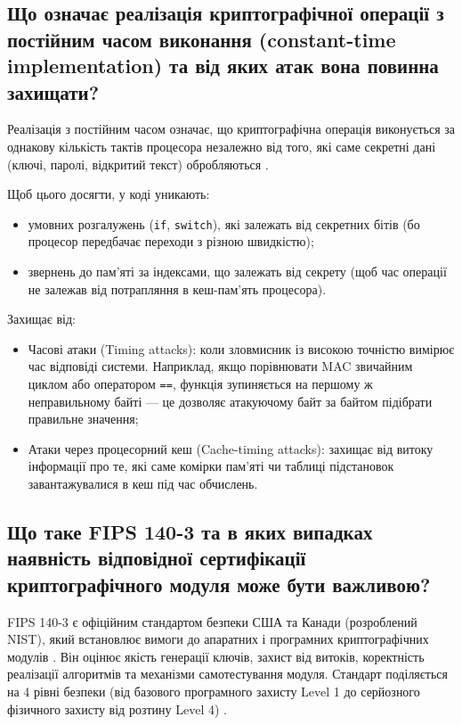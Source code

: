 \subsection{Що означає реалізація криптографічної операції з постійним часом виконання (constant-time implementation) та від яких атак вона повинна захищати?}

Реалізація з постійним часом означає, що криптографічна операція виконується за однакову кількість тактів процесора незалежно від того, які саме секретні дані (ключі, паролі, відкритий текст) обробляються \cite{Libsodium}.

Щоб цього досягти, у коді уникають:
\begin{itemize}
    \item умовних розгалужень (\texttt{if}, \texttt{switch}), які залежать від секретних бітів (бо процесор передбачає переходи з різною швидкістю);
    \item звернень до пам'яті за індексами, що залежать від секрету (щоб час операції не залежав від потрапляння в кеш-пам'ять процесора).
\end{itemize}

Захищає від:
\begin{itemize}
    \item Часові атаки (Timing attacks): коли зловмисник із високою точністю вимірює час відповіді системи. Наприклад, якщо порівнювати MAC звичайним циклом або оператором \texttt{==}, функція зупиняється на першому ж неправильному байті --- це дозволяє атакуючому байт за байтом підібрати правильне значення;
    \item Атаки через процесорний кеш (Cache-timing attacks): захищає від витоку інформації про те, які саме комірки пам'яті чи таблиці підстановок завантажувалися в кеш під час обчислень.
\end{itemize}


\subsection{Що таке FIPS 140-3 та в яких випадках наявність відповідної сертифікації криптографічного модуля може бути важливою?}

FIPS 140-3 є офіційним стандартом безпеки США та Канади (розроблений NIST), який встановлює вимоги до апаратних і програмних криптографічних модулів \cite{FIPS140-3, CMVP}. Він оцінює якість генерації ключів, захист від витоків, коректність реалізації алгоритмів та механізми самотестування модуля. Стандарт поділяється на 4 рівні безпеки (від базового програмного захисту Level 1 до серйозного фізичного захисту від розтину Level 4) \cite{SP800-140}.


